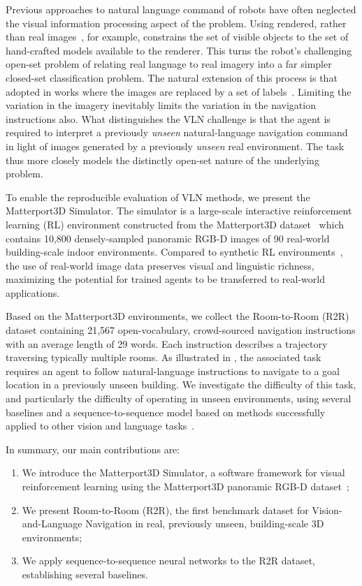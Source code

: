 \documentclass[10pt,twocolumn,letterpaper]{article}
\begin{document}
Previous approaches to natural language command of robots have often neglected the visual information processing aspect of the problem. Using rendered, rather than real images~\cite{beattie2016deepmind,Kempka2016ViZDoom,zhu2017icra}, for example, constrains the set of visible objects to the set of hand-crafted models available to the renderer.  This turns the robot's challenging open-set problem of relating real language to real imagery into a far simpler closed-set classification problem.  The natural extension of this process is that adopted in works where the images are replaced by a set of labels~\cite{chen2011learning,tellex2011understanding}.  Limiting the variation in the imagery inevitably limits the variation in the navigation instructions also. What distinguishes the VLN challenge is that the agent is required to interpret a previously \textit{unseen} natural-language navigation command in light of images generated by a previously \textit{unseen} real environment.  The task thus more closely models the distinctly open-set nature of the underlying problem.

To enable the reproducible evaluation of VLN methods, we present the Matterport3D Simulator. The simulator is a large-scale interactive reinforcement learning (RL) environment constructed from the Matterport3D dataset~\cite{Matterport3D} which contains 10,800 densely-sampled panoramic RGB-D images of 90 real-world building-scale indoor environments. Compared to synthetic RL environments~\cite{beattie2016deepmind,Kempka2016ViZDoom, zhu2017icra}, the use of real-world image data preserves visual and linguistic richness, maximizing the potential for trained agents to be transferred to real-world applications. 

Based on the Matterport3D environments, we collect the Room-to-Room (R2R) dataset containing 21,567 open-vocabulary, crowd-sourced navigation instructions with an average length of 29 words. Each instruction describes a trajectory traversing typically multiple rooms. As illustrated in , the associated task requires an agent to follow natural-language instructions to navigate to a goal location in a previously unseen building. We investigate the difficulty of this task, and particularly the difficulty of operating in unseen environments, using several baselines and a sequence-to-sequence model based on methods successfully applied to other vision and language tasks~\cite{VQA,Chen2015,balanced_vqa_v2}.

In summary, our main contributions are:
\begin{enumerate}[noitemsep]
	\item We introduce the Matterport3D Simulator, a software framework for visual reinforcement learning using the Matterport3D panoramic RGB-D dataset~\cite{Matterport3D};
	\item We present Room-to-Room (R2R), the first benchmark dataset for Vision-and-Language Navigation in real, previously unseen, building-scale 3D environments;
	\item We apply sequence-to-sequence neural networks to the R2R dataset, establishing several baselines. 
\end{enumerate}
\end{document}
